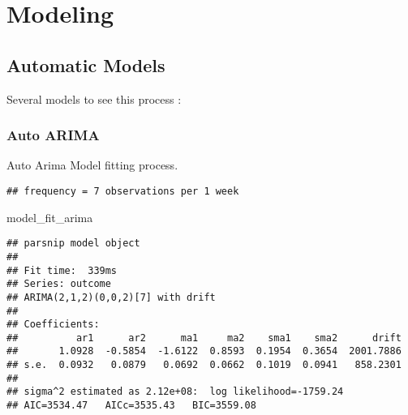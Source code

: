 \documentclass[
]{article}
\newenvironment{Shaded}{\begin{snugshade}}{\end{snugshade}}
\newcommand{\KeywordTok}[1]{\textcolor[rgb]{0.13,0.29,0.53}{\textbf{#1}}}
\newcommand{\NormalTok}[1]{#1}
\newcommand{\OperatorTok}[1]{\textcolor[rgb]{0.81,0.36,0.00}{\textbf{#1}}}
\newcommand{\StringTok}[1]{\textcolor[rgb]{0.31,0.60,0.02}{#1}}
\begin{document}
\hypertarget{modeling}{%
\section{Modeling}\label{modeling}}

\hypertarget{automatic-models}{%
\subsection{Automatic Models}\label{automatic-models}}

Several models to see this process :

\hypertarget{auto-arima}{%
\subsubsection{Auto ARIMA}\label{auto-arima}}

Auto Arima Model fitting process.

\begin{Shaded}
\end{Shaded}

\begin{verbatim}
## frequency = 7 observations per 1 week
\end{verbatim}

\begin{Shaded}
\begin{Highlighting}[]
\NormalTok{model_fit_arima}
\end{Highlighting}
\end{Shaded}

\begin{verbatim}
## parsnip model object
## 
## Fit time:  339ms 
## Series: outcome 
## ARIMA(2,1,2)(0,0,2)[7] with drift 
## 
## Coefficients:
##          ar1      ar2      ma1     ma2    sma1    sma2      drift
##       1.0928  -0.5854  -1.6122  0.8593  0.1954  0.3654  2001.7886
## s.e.  0.0932   0.0879   0.0692  0.0662  0.1019  0.0941   858.2301
## 
## sigma^2 estimated as 2.12e+08:  log likelihood=-1759.24
## AIC=3534.47   AICc=3535.43   BIC=3559.08
\end{verbatim}
\end{document}
